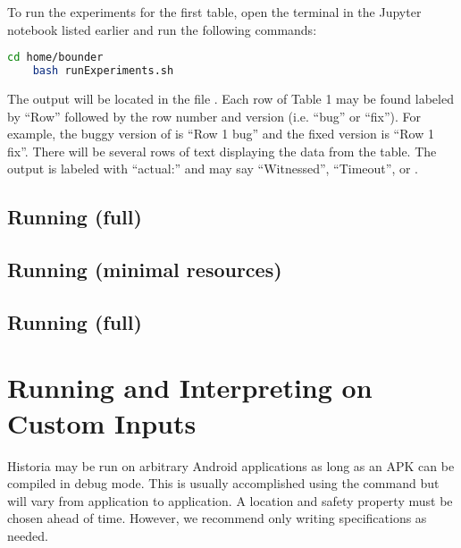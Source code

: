 \documentclass{acmart} %
\begin{document}

To run the experiments for the first table, open the terminal in the Jupyter notebook listed earlier and run the following commands:
\begin{lstlisting}[language=bash]
    cd home/bounder
    bash runExperiments.sh
\end{lstlisting}

The output will be located in the file .  Each row of Table 1 may be found labeled by ``Row'' followed by the row number and version (i.e. ``bug'' or ``fix'').  For example, the buggy version of \apGa is ``Row 1 bug'' and the fixed version is ``Row 1 fix''.  There will be several rows of text displaying the data from the table.  The output is labeled with ``actual:'' and may say ``Witnessed'', ``Timeout'', or .



\subsection{Running  (full)}

\TODO{}

\subsection{Running  (minimal resources)}

\subsection{Running  (full)}

\TODO{}



\section{Running and Interpreting \toolname on Custom Inputs}

Historia may be run on arbitrary Android applications as long as an APK can be compiled in debug mode.  This is usually accomplished using the command  but will vary from application to application. A location and safety property must be chosen ahead of time.  However, we recommend only writing \newls specifications as needed.
\end{document}
